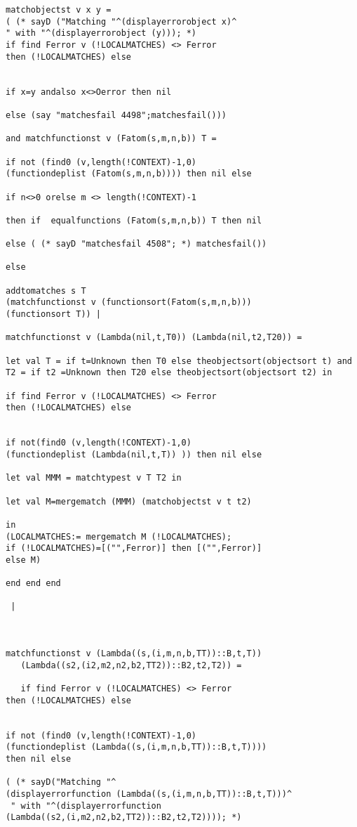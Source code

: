 \documentclass[12pt]{article}
\begin{document}
\begin{verbatim}
matchobjectst v x y = 
( (* sayD ("Matching "^(displayerrorobject x)^
" with "^(displayerrorobject (y))); *)
if find Ferror v (!LOCALMATCHES) <> Ferror 
then (!LOCALMATCHES) else


if x=y andalso x<>Oerror then nil 

else (say "matchesfail 4498";matchesfail()))

and matchfunctionst v (Fatom(s,m,n,b)) T =

if not (find0 (v,length(!CONTEXT)-1,0) 
(functiondeplist (Fatom(s,m,n,b)))) then nil else

if n<>0 orelse m <> length(!CONTEXT)-1

then if  equalfunctions (Fatom(s,m,n,b)) T then nil

else ( (* sayD "matchesfail 4508"; *) matchesfail())

else 

addtomatches s T 
(matchfunctionst v (functionsort(Fatom(s,m,n,b))) 
(functionsort T)) |

matchfunctionst v (Lambda(nil,t,T0)) (Lambda(nil,t2,T20)) =

let val T = if t=Unknown then T0 else theobjectsort(objectsort t) and
T2 = if t2 =Unknown then T20 else theobjectsort(objectsort t2) in

if find Ferror v (!LOCALMATCHES) <> Ferror 
then (!LOCALMATCHES) else


if not(find0 (v,length(!CONTEXT)-1,0) 
(functiondeplist (Lambda(nil,t,T)) )) then nil else

let val MMM = matchtypest v T T2 in

let val M=mergematch (MMM) (matchobjectst v t t2)

in
(LOCALMATCHES:= mergematch M (!LOCALMATCHES);
if (!LOCALMATCHES)=[("",Ferror)] then [("",Ferror)]
else M)

end end end

 |
 
 

matchfunctionst v (Lambda((s,(i,m,n,b,TT))::B,t,T))
   (Lambda((s2,(i2,m2,n2,b2,TT2))::B2,t2,T2)) =
   
   if find Ferror v (!LOCALMATCHES) <> Ferror 
then (!LOCALMATCHES) else

   
if not (find0 (v,length(!CONTEXT)-1,0) 
(functiondeplist (Lambda((s,(i,m,n,b,TT))::B,t,T)))) 
then nil else

( (* sayD("Matching "^
(displayerrorfunction (Lambda((s,(i,m,n,b,TT))::B,t,T)))^
 " with "^(displayerrorfunction 
(Lambda((s2,(i,m2,n2,b2,TT2))::B2,t2,T2)))); *)


\end{verbatim}
\end{document}
